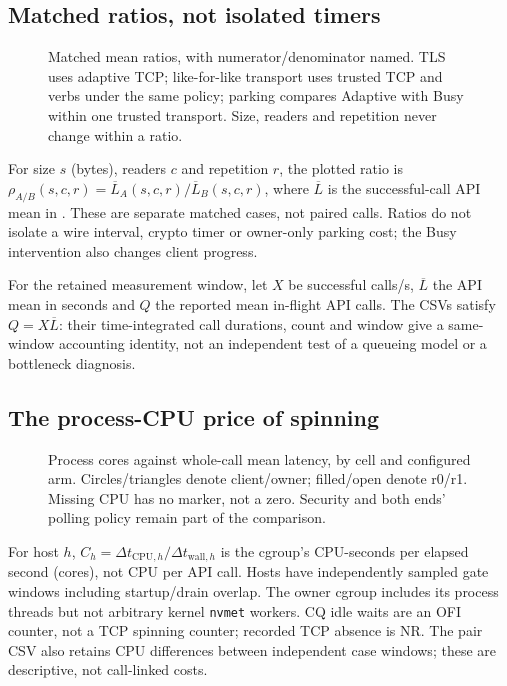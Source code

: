 \clearpage
\subsection{Matched ratios, not isolated timers}
\begin{figure}[H]\centering{}
\caption{Matched mean ratios, with numerator/denominator named. TLS uses adaptive TCP; like-for-like transport uses trusted TCP and verbs under the same policy; parking compares Adaptive with Busy within one trusted transport. Size, readers and repetition never change within a ratio.}
\end{figure}
For size $s$ (bytes), readers $c$ and repetition $r$, the plotted ratio is $\rho_{A/B}(s,c,r)=\overline L_A(s,c,r)/\overline L_B(s,c,r)$, where $\overline L$ is the successful-call API mean in \us{}. These are separate matched cases, not paired calls. Ratios do not isolate a wire interval, crypto timer or owner-only parking cost; the Busy intervention also changes client progress.

For the retained measurement window, let $X$ be successful calls/s, $\overline L$ the API mean in seconds and $Q$ the reported mean in-flight API calls. The CSVs satisfy $Q=X\overline L$: their time-integrated call durations, count and window give a same-window accounting identity, not an independent test of a queueing model or a bottleneck diagnosis.

\clearpage
\subsection{The process-CPU price of spinning}
\begin{figure}[H]\centering{}
\caption{Process cores against whole-call mean latency, by cell and configured arm. Circles/triangles denote client/owner; filled/open denote r0/r1. Missing CPU has no marker, not a zero. Security and both ends' polling policy remain part of the comparison.}
\end{figure}
For host $h$, $C_h=\Delta t_{\mathrm{CPU},h}/\Delta t_{\mathrm{wall},h}$ is the cgroup's CPU-seconds per elapsed second (cores), not CPU per API call. Hosts have independently sampled gate windows including startup/drain overlap. The owner cgroup includes its process threads but not arbitrary kernel \texttt{nvmet} workers. CQ idle waits are an OFI counter, not a TCP spinning counter; recorded TCP absence is NR. The pair CSV also retains CPU differences between independent case windows; these are descriptive, not call-linked costs.

